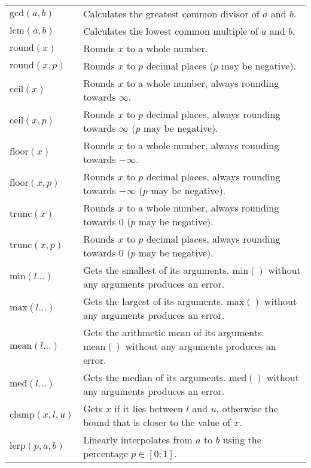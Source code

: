 \documentclass[10pt]{article}
\newcommand{\tabgap}{\vspace{3mm}\\}
\begin{document}
\begin{longtable}{p{}p{}}
        $ \mathrm{gcd}(a, b) $                     & Calculates the greatest common divisor of $ a $ and $ b $. \\
        $ \mathrm{lcm}(a, b) $                     & Calculates the lowest common multiple of $ a $ and $ b $. \tabgap
        $ \mathrm{round}(x) $                      & Rounds $ x $ to a whole number. \\
        $ \mathrm{round}(x, p) $                   & Rounds $ x $ to $ p $ decimal places ($ p $ may be negative). \\
        $ \mathrm{ceil}(x) $                       & Rounds $ x $ to a whole number, always rounding towards $ \infty $. \\
        $ \mathrm{ceil}(x, p) $                    & Rounds $ x $ to $ p $ decimal places, always rounding towards $ \infty $ ($ p $ may be negative). \\
        $ \mathrm{floor}(x) $                      & Rounds $ x $ to a whole number, always rounding towards $ -\infty $. \\
        $ \mathrm{floor}(x, p) $                   & Rounds $ x $ to $ p $ decimal places, always rounding towards $ -\infty $ ($ p $ may be negative). \\
        $ \mathrm{trunc}(x) $                      & Rounds $ x $ to a whole number, always rounding towards $ 0 $ ($ p $ may be negative). \\
        $ \mathrm{trunc}(x, p) $                   & Rounds $ x $ to $ p $ decimal places, always rounding towards $ 0 $ ($ p $ may be negative). \tabgap
        $ \mathrm{min}(l\dots) $                   & Gets the smallest of its arguments. $ \mathrm{min}() $ without any arguments produces an error. \\
        $ \mathrm{max}(l\dots) $                   & Gets the largest of its arguments. $ \mathrm{max}() $ without any arguments produces an error. \\
        $ \mathrm{mean}(l\dots) $                  & Gets the arithmetic mean of its arguments. $ \mathrm{mean}() $ without any arguments produces an error. \\
        $ \mathrm{med}(l\dots) $                   & Gets the median of its arguments. $ \mathrm{med}() $ without any arguments produces an error. \tabgap
        $ \mathrm{clamp}(x, l, u) $                & Gets $ x $ if it lies between $ l $ and $ u $, otherwise the bound that is closer to the value of $ x $. \\
        $ \mathrm{lerp}(p, a, b) $                 & Linearly interpolates from $ a $ to $ b $ using the percentage $ p \in [0;1] $. \tabgap

\end{longtable}
\end{document}
